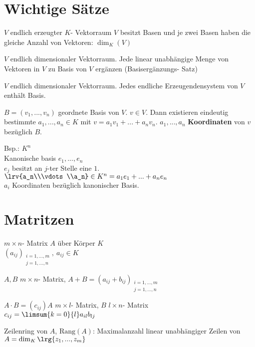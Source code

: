 \section{Wichtige Sätze}
		\item $V$ endlich erzeugter $K$- Vektorraum $V$ besitzt Basen und je zwei Basen haben die gleiche Anzahl von Vektoren: $\dim_K(V)$
		\item $V$ endlich dimensionaler Vektorraum. Jede linear unabhängige Menge von Vektoren in $V$ zu Basis von $V$ ergänzen (Basisergänzungs- Satz)
		\item $V$ endlich dimensionaler Vektorraum. Jedes endliche Erzeugendensystem von $V$ enthält Basis.
		\item $B=(v_1,...,v_n)$ geordnete Basis von $V$. $v\in V$. Dann existieren eindeutig bestimmte $a_1,...,a_n\in K$ mit $v=a_1v_1+...+a_nv_n$. $a_1,...,a_n$ \textbf{Koordinaten} von $v$ bezüglich $B$.

		Bsp.: $K^n$\\
		Kanonische basis $e_1,...,e_n$\\
		$e_j$ besitzt an $j$-ter Stelle eine $1$.\\
		$\lrv{a_n\\\vdots\\a_n}\in K^n=a_1e_1+...+a_ne_n$\\
		$a_i$ Koordinaten bezüglich kanonischer Basis.
	\subExEnd

\section{Matritzen}
		\item $m\times n$- Matrix $A$ über Körper $K$\\
		$(a_{ij})_{
			\begin{array}{l}
			i=1,...,m\\
			j=1,...,n
			\end{array}
		},\ a_{ij}\in K$
		\item $A,B$ $m\times n$- Matrix, $A+B=(a_{ij}+b_{ij})_{
			\begin{array}{l}
			i=1,...,m\\
			j=1,...,n
			\end{array}
		}$
		\item $A\cdot B=(c_{ij})$\quad $A$ $m\times l$- Matrix, $B$ $l\times n$- Matrix\\
		$c_{ij}=\limsum{k=0}{l}a_{il}b_{lj}$
		\item Zeilenring von $A$, $\mbox{Rang}(A)$: Maximalanzahl linear unabhängiger Zeilen von $A=\dim_K\lrg{z_1,...,z_m}$
	\subExEnd

